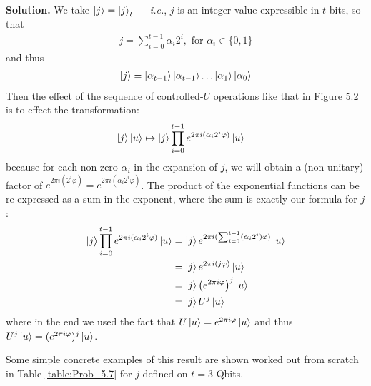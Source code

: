 \documentclass{article}
\begin{document}
\begin{enumerate}[label=\textbf{(\arabic*)}]
\textbf{Solution.} We take $\ket{j} = \ket{j}_{t}$ --- \textit{i.e.}, $j$ is an integer value expressible in $t$ bits, so that
\begin{align}
    j = \sum_{i=0}^{t-1} \alpha_i 2^i, \text{ for } \alpha_i \in \{0, 1\}
\end{align}
and thus
\begin{align}
    \ket{j} = \ket{\alpha_{t-1}}\ket{\alpha_{t-1}}\ldots\ket{\alpha_{1}}\ket{\alpha_{0}}
\end{align}
Then the effect of the sequence of controlled-$U$ operations like that in Figure 5.2 is to effect the transformation:
\begin{align}
    \ket{j}\ket{u} 
    &\mapsto
    \ket{j}\prod_{i=0}^{t-1}{e^{2\pi i (\alpha_i 2^i \varphi)}}\ket{u}
\end{align}
because for each non-zero $\alpha_i$ in the expansion of $j$, we will obtain a (non-unitary) factor of $e^{2\pi i (2^i \varphi)} = e^{2\pi i (\alpha_i 2^i \varphi)}$. The product of the exponential functions can be re-expressed as a sum in the exponent, where the sum is exactly our formula for $j$: 
\begin{align}
    \ket{j}\prod_{i=0}^{t-1}{e^{2\pi i (\alpha_i 2^i \varphi)}}\ket{u}
    &=
    \ket{j}{e^{2\pi i (\sum_{i=0}^{t-1}(\alpha_i 2^i) \varphi)}}\ket{u}\\
    &=
    \ket{j}{e^{2\pi i (j \varphi)}}\ket{u}\\
    &=
    \ket{j}{\left(e^{2\pi i \varphi}\right)^j}\ket{u}\\
    &=
    \ket{j}{U^j}\ket{u}\\
\end{align}
where in the end we used the fact that $U\ket{u} = e^{2\pi i \varphi}\ket{u}$ and thus $U^{j}\ket{u} = (e^{2\pi i \varphi})^j\ket{u}$.

Some simple concrete examples of this result are shown worked out from scratch in Table \ref{table:Prob_5.7} for $j$ defined on $t=3$ Qbits.

\vspace{0.2in}


\end{enumerate}
\end{document}
